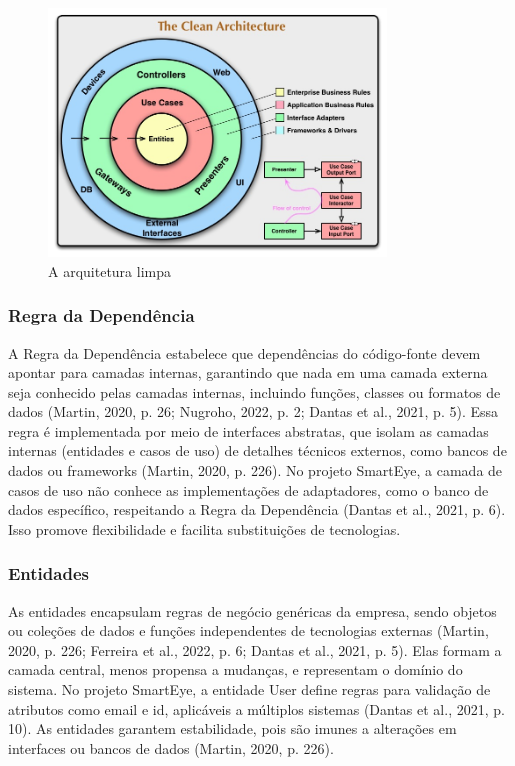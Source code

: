          \begin{figure}[H] %
            \centering
            \includegraphics[width=0.8\textwidth]{figuras/clean_arch_1.jpg}
            \caption{A arquitetura limpa}
            \label{fig:figura_clean_arch_1}
            \newcommand{\source}{Fonte: \cite{livro:martin:cleanarch}}
        \end{figure}
        
        \subsubsection{Regra da Dependência}
            \par A Regra da Dependência estabelece que dependências do código-fonte devem apontar para camadas internas, garantindo que nada em uma camada externa seja conhecido pelas camadas internas, incluindo funções, classes ou formatos de dados (Martin, 2020, p. 26; Nugroho, 2022, p. 2; Dantas et al., 2021, p. 5). Essa regra é implementada por meio de interfaces abstratas, que isolam as camadas internas (entidades e casos de uso) de detalhes técnicos externos, como bancos de dados ou frameworks (Martin, 2020, p. 226). No projeto SmartEye, a camada de casos de uso não conhece as implementações de adaptadores, como o banco de dados específico, respeitando a Regra da Dependência (Dantas et al., 2021, p. 6). Isso promove flexibilidade e facilita substituições de tecnologias.


        \subsubsection{Entidades}
            \par As entidades encapsulam regras de negócio genéricas da empresa, sendo objetos ou coleções de dados e funções independentes de tecnologias externas (Martin, 2020, p. 226; Ferreira et al., 2022, p. 6; Dantas et al., 2021, p. 5). Elas formam a camada central, menos propensa a mudanças, e representam o domínio do sistema. No projeto SmartEye, a entidade User define regras para validação de atributos como email e id, aplicáveis a múltiplos sistemas (Dantas et al., 2021, p. 10). As entidades garantem estabilidade, pois são imunes a alterações em interfaces ou bancos de dados (Martin, 2020, p. 226).
            
